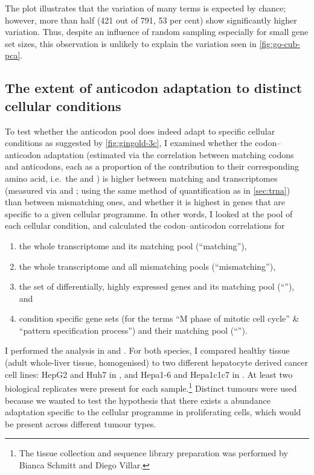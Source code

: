The plot illustrates that the variation of many \go terms is expected by chance;
however, more than half (\num{421} out of \num{791}, \num{53} per cent) show
significantly higher variation. Thus, despite an influence of random sampling
especially for small gene set sizes, this observation is unlikely to explain the
variation seen in \cref{fig:go-cub-pca}.

\subsection{The extent of anticodon adaptation to distinct cellular conditions}

To test whether the anticodon pool does indeed adapt to specific cellular
conditions as suggested by \cref{fig:gingold-3c}, I examined whether the
codon--anticodon adaptation (estimated via the correlation between matching
codons and anticodons, each as a proportion of the contribution to their
corresponding amino acid, i.e.\ the \rcu and \raa) is higher between matching
\mrna and \trna transcriptomes (measured via \rnaseq and  \chipseq; using
the same method of quantification as in \cref{sec:trna}) than between
mismatching ones, and whether it is highest in genes that are specific to a
given cellular programme. In other words, I looked at the \mrna pool of each
cellular condition, and calculated the codon--anticodon correlations for

\begin{enumerate}
    \item the whole transcriptome and its matching \trna pool (“matching”),
    \item the whole transcriptome and all mismatching \trna pools
        (“mismatching”),
    \item the set of differentially, highly expressed \mrna genes and its
        matching \trna pool (“”), and
    \item condition specific gene sets (for the \go terms “M phase of mitotic
        cell cycle” \& “pattern specification process”) and their matching \trna
        pool (“”).
\end{enumerate}

I performed the analysis in \mmu and \hsa. For both species, I compared healthy
tissue (adult whole-liver tissue, homogenised) to two different hepatocyte
derived cancer cell lines: HepG2 and Huh7 in \hsa, and Hepa1-6 and Hepa1c1c7 in
\mmu. At least two biological replicates were present for each
sample.\footnote{The tissue collection and sequence library preparation was
performed by Bianca Schmitt and Diego Villar.} Distinct tumours were used
because we wanted to test the hypothesis that there exists a \trna abundance
adaptation specific to the cellular programme in proliferating cells, which
would be present across different tumour types.

